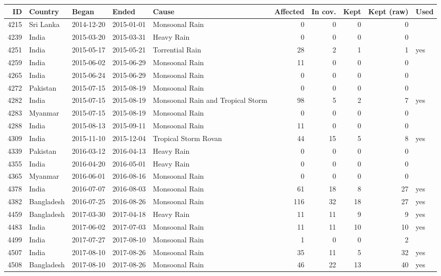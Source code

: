 \begin{tabular}{rllllrrrrl}\toprule ID & Country & Began & Ended & Cause & Affected & In cov. & Kept & Kept (raw) & Used \\ \midrule
4215 & Sri Lanka & 2014-12-20 & 2015-01-01 & Monsoonal Rain & 0 & 0 & 0 & 0 &  \\
4239 & India & 2015-03-20 & 2015-03-31 & Heavy Rain & 0 & 0 & 0 & 0 &  \\
4251 & India & 2015-05-17 & 2015-05-21 & Torrential Rain & 28 & 2 & 1 & 1 & yes \\
4259 & India & 2015-06-02 & 2015-06-29 & Monsoonal Rain & 11 & 0 & 0 & 0 &  \\
4265 & India & 2015-06-24 & 2015-06-29 & Monsoonal Rain & 0 & 0 & 0 & 0 &  \\
4272 & Pakistan & 2015-07-15 & 2015-08-19 & Monsoonal Rain & 0 & 0 & 0 & 0 &  \\
4282 & India & 2015-07-15 & 2015-08-19 & Monsoonal Rain and Tropical Storm  & 98 & 5 & 2 & 7 & yes \\
4283 & Myanmar & 2015-07-15 & 2015-08-19 & Monsoonal Rain & 0 & 0 & 0 & 0 &  \\
4288 & India & 2015-08-13 & 2015-09-11 & Monsoonal Rain & 11 & 0 & 0 & 0 &  \\
4309 & India & 2015-11-10 & 2015-12-04 & Tropical Storm Rovan & 44 & 15 & 5 & 8 & yes \\
4339 & Pakistan & 2016-03-12 & 2016-04-13 & Heavy Rain & 0 & 0 & 0 & 0 &  \\
4355 & India & 2016-04-20 & 2016-05-01 & Heavy Rain & 0 & 0 & 0 & 0 &  \\
4365 & Myanmar & 2016-06-01 & 2016-08-16 & Monsoonal Rain & 0 & 0 & 0 & 0 &  \\
4378 & India & 2016-07-07 & 2016-08-03 & Monsoonal Rain & 61 & 18 & 8 & 27 & yes \\
4382 & Bangladesh & 2016-07-25 & 2016-08-26 & Monsoonal Rain & 116 & 32 & 18 & 27 & yes \\
4459 & Bangladesh & 2017-03-30 & 2017-04-18 & Heavy Rain & 11 & 11 & 9 & 9 & yes \\
4483 & India & 2017-06-02 & 2017-07-03 & Monsoonal Rain & 11 & 11 & 10 & 10 & yes \\
4499 & India & 2017-07-27 & 2017-08-10 & Monsoonal Rain & 1 & 0 & 0 & 2 &  \\
4507 & India & 2017-08-10 & 2017-08-26 & Monsoonal Rain & 35 & 11 & 5 & 32 & yes \\
4508 & Bangladesh & 2017-08-10 & 2017-08-26 & Monsoonal Rain & 46 & 22 & 13 & 40 & yes \\

\end{tabular}
